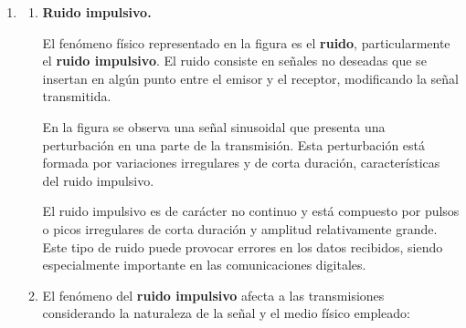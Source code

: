 \documentclass[11pt,a4paper]{article}
\begin{document}
\begin{enumerate}[label=\arabic*)]
\begin{enumerate}[label=\alph*)]
                ¿Cómo se conecta esto último con lo visto sobre el efecto Doppler (fenómeno presentado en el ejercicio)? Observando la fórmula y los parámetros que entran en juego, resulta evidente que, al acercarse y alejarse el avión a una velocidad mucho mayor que la de un automóvil promedio, el efecto Doppler termina apareciendo dado este corrimiento de frecuencia tan alto y constante que se repite antena tras antena, algo que no está contemplado en la red, ya que no fue diseñada para esto.
        \end{enumerate}
  \item
        \begin{enumerate}[label=\alph*)]
          \item
               \textbf{Ruido impulsivo.}

                El fenómeno físico representado en la figura es el \textbf{ruido},
                particularmente el \textbf{ruido impulsivo}. El ruido consiste en señales
                no deseadas que se insertan en algún punto entre el emisor y el receptor,
                modificando la señal transmitida.

                En la figura se observa una señal sinusoidal que presenta una perturbación
                en una parte de la transmisión. Esta perturbación está formada por
                variaciones irregulares y de corta duración, características del ruido
                impulsivo.

                El ruido impulsivo es de carácter no continuo y está compuesto por pulsos
                o picos irregulares de corta duración y amplitud relativamente grande.
                Este tipo de ruido puede provocar errores en los datos recibidos,
                siendo especialmente importante en las comunicaciones digitales.

          \item
                    El fenómeno del \textbf{ruido impulsivo} afecta a las transmisiones considerando la naturaleza de la señal y el medio físico empleado:

\end{enumerate}
\end{enumerate}
\end{document}
